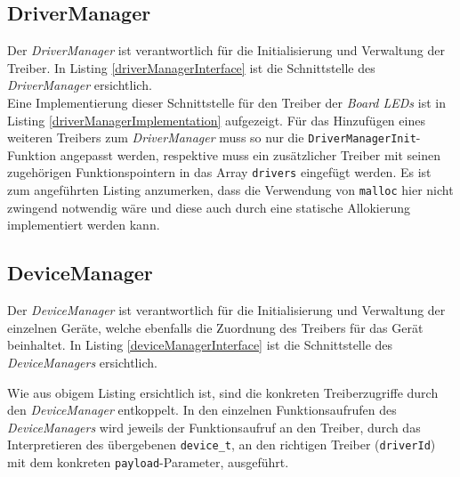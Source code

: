 \subsection{DriverManager}
\label{secDriverManager}
Der \textit{DriverManager} ist verantwortlich für die Initialisierung und Verwaltung der Treiber. In Listing \ref{driverManagerInterface} ist die Schnittstelle des \textit{DriverManager} ersichtlich.\\



Eine Implementierung dieser Schnittstelle für den Treiber der \textit{Board LEDs} ist in Listing \ref{driverManagerImplementation} aufgezeigt. Für das Hinzufügen eines weiteren Treibers zum \textit{DriverManager} muss so nur die \texttt{DriverManagerInit}-Funktion angepasst werden, respektive muss ein zusätzlicher Treiber mit seinen zugehörigen Funktionspointern in das Array \texttt{drivers} eingefügt werden. Es ist zum angeführten Listing anzumerken, dass die Verwendung von \texttt{malloc} hier nicht zwingend notwendig wäre und diese auch durch eine statische Allokierung implementiert werden kann.\\



\subsection{DeviceManager}
\label{secDeviceManager}
Der \textit{DeviceManager} ist verantwortlich für die Initialisierung und Verwaltung der einzelnen Geräte, welche ebenfalls die Zuordnung des Treibers für das Gerät beinhaltet. In Listing \ref{deviceManagerInterface} ist die Schnittstelle des \textit{DeviceManagers} ersichtlich.



Wie aus obigem Listing ersichtlich ist, sind die konkreten Treiberzugriffe durch den \textit{DeviceManager} entkoppelt. In den einzelnen Funktionsaufrufen des \textit{DeviceManagers} wird jeweils der Funktionsaufruf an den Treiber, durch das Interpretieren des übergebenen \texttt{device\_t}, an den richtigen Treiber (\texttt{driverId}) mit dem konkreten \texttt{payload}-Parameter, ausgeführt.\\

\pagebreak 